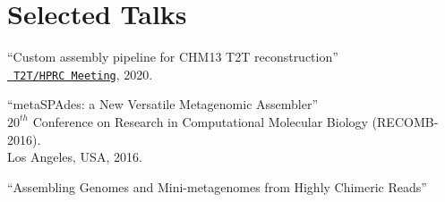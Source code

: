 \section{Selected Talks} %
\vspace*{-.7cm}
\begin{outerlist}
 \item ``Custom assembly pipeline for CHM13 T2T reconstruction''\\
       \href{www.t2t-hprc-2020conference.com}{\tt
       T2T/HPRC Meeting}, 2020.
 \item ``metaSPAdes: a New Versatile Metagenomic Assembler''\\
       $20^{th}$ Conference on Research in Computational Molecular Biology (RECOMB-2016).\\
       Los Angeles, USA, 2016.
 \item ``Assembling Genomes and Mini-metagenomes from Highly Chimeric Reads''\\

\end{outerlist}
